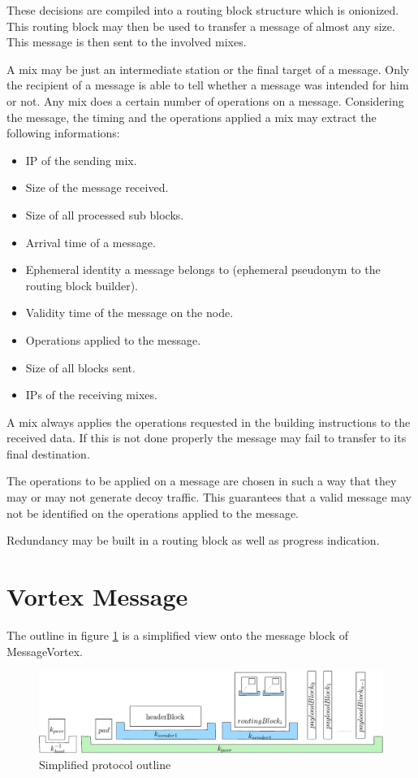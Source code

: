 These decisions are compiled into a routing block structure which is onionized. This routing block may then be used to transfer a message of almost any size. This message is then sent to the involved mixes.

A mix may be just an intermediate station or the final target of a message. Only the recipient of a message is able to tell whether a message was intended for him or not. Any mix does a certain number of operations on a message. Considering the message, the timing and the operations applied a mix may extract the following informations:

\begin{itemize}
	\item IP of the sending mix.
	\item Size of the message received.
	\item Size of all processed sub blocks.
	\item Arrival time of a message.
	\item Ephemeral identity a message belongs to (ephemeral pseudonym to the routing block builder).
	\item Validity time of the message on the node.
	\item Operations applied to the message.
	\item Size of all blocks sent.
	\item IPs of the receiving mixes.
\end{itemize}

A mix always applies the operations requested in the building instructions to the received data. If this is not done properly the message may fail to transfer to its final destination. 

The operations to be applied on a message are chosen in such a way that they may or may not generate decoy traffic. This guarantees that a valid message may not be identified on the operations applied to the message.

Redundancy may be built in a routing block as well as progress indication.

\section{Vortex Message}
The outline in figure \ref{fig:protocolOutline} is a simplified view onto the message block of MessageVortex.

\begin{figure}[hbt]
	\includegraphics[width=\textwidth]{inc/blockLayoutSimplified}
	\caption{Simplified protocol outline}
    \label{fig:protocolOutline}
\end{figure}

